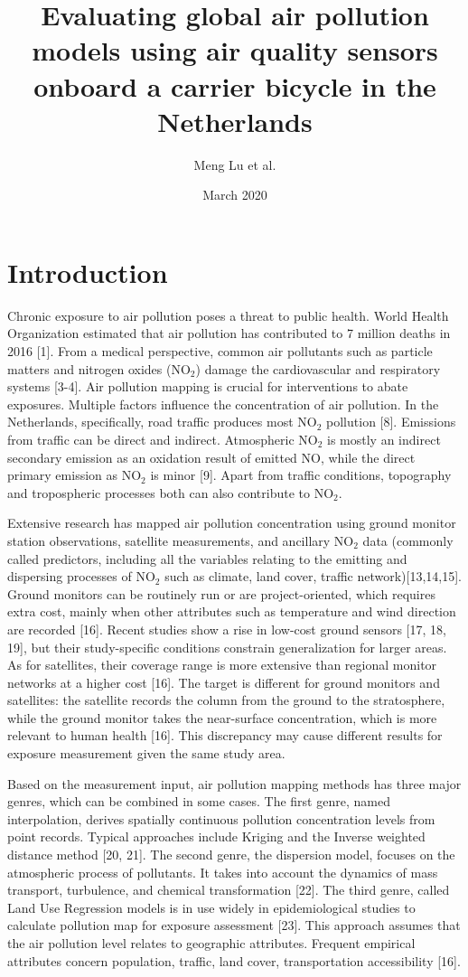 \documentclass{article}
\title{Evaluating global air pollution models using air quality sensors onboard a carrier bicycle in the Netherlands}
\author{Meng Lu et al. }
\date{March 2020}
\begin{document}
\maketitle

\section{Introduction}
Chronic exposure to air pollution poses a threat to public health. World Health Organization estimated that air pollution has contributed to 7 million deaths in 2016 [1]. From a medical perspective, common air pollutants such as particle matters and nitrogen oxides (NO$_2$) damage the cardiovascular and respiratory systems [3-4]. Air pollution mapping is crucial for interventions to abate exposures. Multiple factors influence the concentration of air pollution. In the Netherlands, specifically, road traffic produces most NO$_2$ pollution [8]. Emissions from traffic can be direct and indirect. Atmospheric NO$_2$ is mostly an indirect secondary emission as an oxidation result of emitted NO, while the direct primary emission as NO$_2$ is minor [9]. Apart from traffic conditions, topography and tropospheric processes both can also contribute to NO$_2$.
\par
Extensive research has mapped air pollution concentration using ground monitor station observations, satellite measurements, and ancillary NO$_2$ data (commonly called predictors, including all the variables relating to the emitting and dispersing processes of NO$_2$ such as climate, land cover, traffic network)[13,14,15]. Ground monitors can be routinely run or are project-oriented, which requires extra cost, mainly when other attributes such as temperature and wind direction are recorded [16]. Recent studies show a rise in low-cost ground sensors [17, 18, 19], but their study-specific conditions constrain generalization for larger areas. As for satellites, their coverage range is more extensive than regional monitor networks at a higher cost [16]. The target is different for ground monitors and satellites: the satellite records the column from the ground to the stratosphere, while the ground monitor takes the near-surface concentration, which is more relevant to human health [16]. This discrepancy may cause different results for exposure measurement given the same study area. 
\par
Based on the measurement input, air pollution mapping methods has three major genres, which can be combined in some cases. The first genre, named interpolation, derives spatially continuous pollution concentration levels from point records. Typical approaches include Kriging and the Inverse weighted distance method [20, 21]. The second genre, the dispersion model, focuses on the atmospheric process of pollutants. It takes into account the dynamics of mass transport, turbulence, and chemical transformation [22]. The third genre, called Land Use Regression models is in use widely in epidemiological studies to calculate pollution map for exposure assessment [23]. This approach assumes that the air pollution level relates to geographic attributes. Frequent empirical attributes concern population, traffic, land cover, transportation accessibility [16]. 
\end{document}
